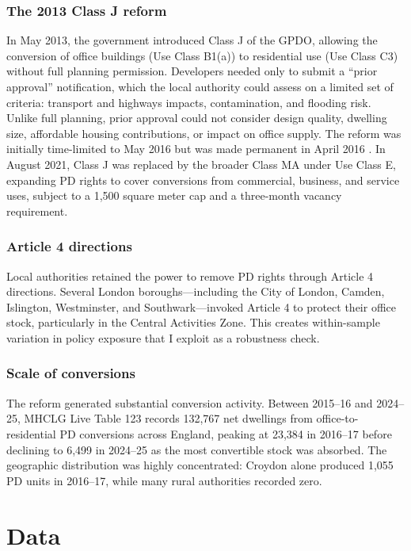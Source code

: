 \documentclass[12pt]{article}
\begin{document}
\subsubsection*{The 2013 Class J reform} In May 2013, the government introduced Class J of the GPDO, allowing the conversion of office buildings (Use Class B1(a)) to residential use (Use Class C3) without full planning permission. Developers needed only to submit a ``prior approval'' notification, which the local authority could assess on a limited set of criteria: transport and highways impacts, contamination, and flooding risk. Unlike full planning, prior approval could not consider design quality, dwelling size, affordable housing contributions, or impact on office supply. The reform was initially time-limited to May 2016 but was made permanent in April 2016 \citep{tcpa2016}. In August 2021, Class J was replaced by the broader Class MA under Use Class E, expanding PD rights to cover conversions from commercial, business, and service uses, subject to a 1,500 square meter cap and a three-month vacancy requirement.

\subsubsection*{Article 4 directions} Local authorities retained the power to remove PD rights through Article 4 directions. Several London boroughs---including the City of London, Camden, Islington, Westminster, and Southwark---invoked Article 4 to protect their office stock, particularly in the Central Activities Zone. This creates within-sample variation in policy exposure that I exploit as a robustness check.

\subsubsection*{Scale of conversions} The reform generated substantial conversion activity. Between 2015--16 and 2024--25, MHCLG Live Table 123 records 132,767 net dwellings from office-to-residential PD conversions across England, peaking at 23,384 in 2016--17 before declining to 6,499 in 2024--25 as the most convertible stock was absorbed. The geographic distribution was highly concentrated: Croydon alone produced 1,055 PD units in 2016--17, while many rural authorities recorded zero.


\section{Data}
\end{document}
